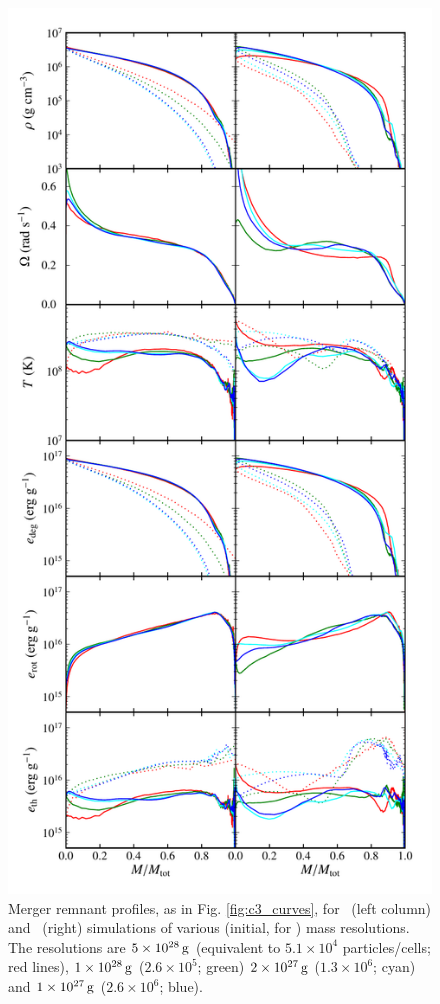 \begin{figure}
\centering
\includegraphics[angle=0,width=0.6\columnwidth]{chapter3_zhu+u/figures/curves_res.pdf}
\caption{Merger remnant profiles, as in Fig. \ref{fig:c3_curves}, for \gasoline\ (left column) and \arepo\ (right) simulations of various (initial, for \arepo) mass resolutions.  The resolutions are $5\times10^{28}\,\mathrm{g}$ (equivalent to $5.1\times10^4$ particles/cells; red lines), $1\times10^{28}\,\mathrm{g}$ ($2.6\times10^{5}$; green) $2\times10^{27}\,\mathrm{g}$ ($1.3\times10^{6}$; cyan) and $1\times10^{27}\,\mathrm{g}$ ($2.6\times10^{6}$; blue).}
\label{fig:c3_res_curves}
\end{figure}

